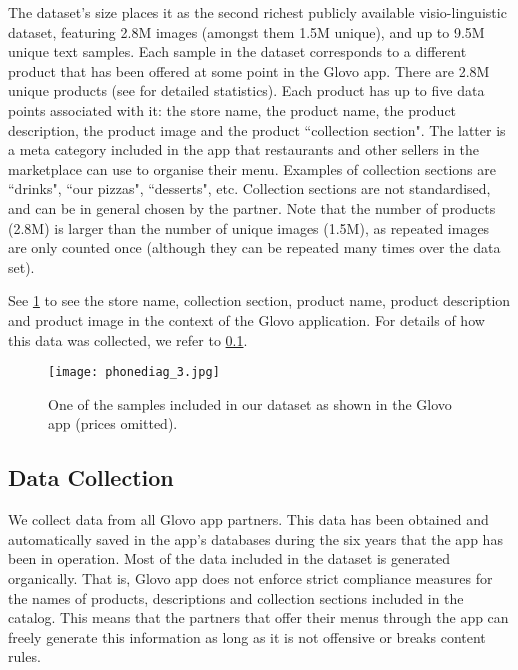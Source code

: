 \documentclass[10pt,twocolumn,letterpaper]{article}
\begin{document}
The dataset's size places it as the second richest publicly available visio-linguistic dataset, featuring  2.8M images (amongst them 1.5M unique), and up to 9.5M unique text samples. Each sample in the dataset corresponds to a different product that has been offered at some point in the Glovo app. There are 2.8M unique products (see \cite{app_2021} for detailed statistics). Each product has up to five data points associated with it: the store name, the product name, the product description, the product image and the product ``collection section". The latter is a meta category included in the app that restaurants and other sellers in the marketplace can use to organise their menu. Examples of collection sections are ``drinks", ``our pizzas", ``desserts", etc. Collection sections are not standardised, and can be in general chosen by the partner. Note that the number of products (2.8M) is larger than the number of unique images (1.5M), as repeated images are only counted once (although they can be repeated many times over the data set). 



See \cref{fig:product_image} to see the store name, collection section, product name, product description and product image in the context of the Glovo application. For details of how this data was collected, we refer to \cref{sec:data_collection}.


\begin{figure}[ht]
  \centering
    \texttt{[image: phonediag\_3.jpg]}
  \caption{One of the samples included in our dataset as shown in the Glovo app (prices omitted). \label{fig:product_image}}
\end{figure}











\subsection{Data Collection}\label{sec:data_collection}
We collect data from all Glovo app partners. This data has been obtained and automatically saved in the app's databases during the six years that the app has been in operation. Most of the data included in the dataset is generated organically. That is, Glovo app does not enforce strict compliance measures for the names of products, descriptions and collection sections included in the catalog. This means that the partners that offer their menus through the app can freely generate this information as long as it is not offensive or breaks content rules.
\end{document}
